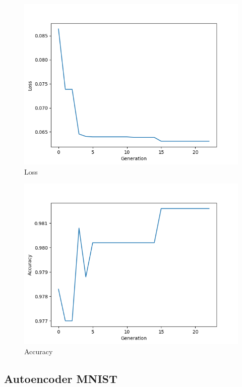 \documentclass[twoside,conference,a4paper]{IEEEtran}
\begin{document}
\begin{figure}[htbp]
        \centering \includegraphics[width=1\columnwidth]{./ia_proj_images/mnist/7/loss.png}
        \caption{
                \label{fig:loss_mnist_07}
                Loss
        }
\end{figure}
\begin{figure}[htbp]
        \centering \includegraphics[width=1\columnwidth]{./ia_proj_images/mnist/7/acc.png}
        \caption{
                \label{fig:acc_mnist_07}
                Accuracy
        }
\end{figure}

\subsection{Autoencoder MNIST}
\end{document}
